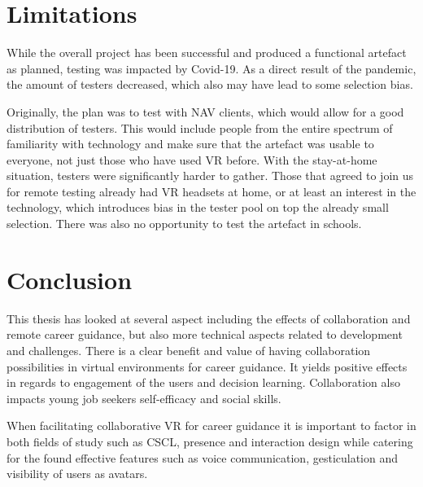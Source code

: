 




\section{Limitations}
While the overall project has been successful and produced a functional artefact as planned, testing was impacted by Covid-19. As a direct result of the pandemic, the amount of testers decreased, which also may have lead to some selection bias.

Originally, the plan was to test with NAV clients, which would allow for a good distribution of testers. This would include people from the entire spectrum of familiarity with technology and make sure that the artefact was usable to everyone, not just those who have used VR before. With the stay-at-home situation, testers were significantly harder to gather. Those that agreed to join us for remote testing already had VR headsets at home, or at least an interest in the technology, which introduces bias in the tester pool on top the already small selection. There was also no opportunity to test the artefact in schools.






\section{Conclusion}
This thesis has looked at several aspect including the effects of collaboration and remote career guidance, but also more technical aspects related to development and challenges. 
There is a clear benefit and value of having collaboration possibilities in virtual environments for career guidance. It yields positive effects in regards to engagement of the users and decision learning. Collaboration also impacts young job seekers self-efficacy and social skills. 

When facilitating collaborative VR for career guidance it is important to factor in both fields of study such as CSCL, presence and interaction design while catering for the found effective features such as voice communication, gesticulation and visibility of users as avatars.   



